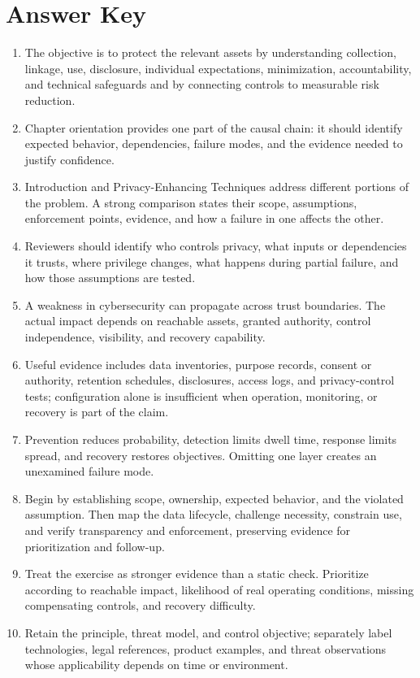 \documentclass[11pt]{article}
\begin{document}
\section*{Answer Key}
\begin{enumerate}
\item The objective is to protect the relevant assets by understanding collection, linkage, use, disclosure, individual expectations, minimization, accountability, and technical safeguards and by connecting controls to measurable risk reduction.
\item Chapter orientation provides one part of the causal chain: it should identify expected behavior, dependencies, failure modes, and the evidence needed to justify confidence.
\item Introduction and Privacy-Enhancing Techniques address different portions of the problem. A strong comparison states their scope, assumptions, enforcement points, evidence, and how a failure in one affects the other.
\item Reviewers should identify who controls privacy, what inputs or dependencies it trusts, where privilege changes, what happens during partial failure, and how those assumptions are tested.
\item A weakness in cybersecurity can propagate across trust boundaries. The actual impact depends on reachable assets, granted authority, control independence, visibility, and recovery capability.
\item Useful evidence includes data inventories, purpose records, consent or authority, retention schedules, disclosures, access logs, and privacy-control tests; configuration alone is insufficient when operation, monitoring, or recovery is part of the claim.
\item Prevention reduces probability, detection limits dwell time, response limits spread, and recovery restores objectives. Omitting one layer creates an unexamined failure mode.
\item Begin by establishing scope, ownership, expected behavior, and the violated assumption. Then map the data lifecycle, challenge necessity, constrain use, and verify transparency and enforcement, preserving evidence for prioritization and follow-up.
\item Treat the exercise as stronger evidence than a static check. Prioritize according to reachable impact, likelihood of real operating conditions, missing compensating controls, and recovery difficulty.
\item Retain the principle, threat model, and control objective; separately label technologies, legal references, product examples, and threat observations whose applicability depends on time or environment.
\end{enumerate}
\end{document}
